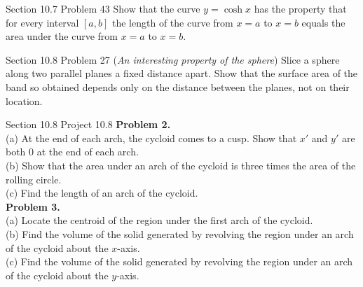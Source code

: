 \documentclass{article}
\begin{document}
    \begin{tbhtheorem}{Section 10.7 Problem 43}
        Show that the curve $y=\cosh{x}$ has the property that for every interval $[a,b]$ the length of the curve from $x=a$ to $x=b$ equals the area under the curve from $x=a$ to $x=b$.
    \end{tbhtheorem}

    \begin{tbhtheorem}{Section 10.8 Problem 27}
        (\textit{An interesting property of the sphere}) Slice a sphere along two parallel planes a fixed distance apart. Show that the surface area of the band so obtained depends only on the distance between the
        planes, not on their location.
    \end{tbhtheorem}

    \begin{tbhtheorem}{Section 10.8 Project 10.8}
        \textbf{Problem 2.} \\
        (a) At the end of each arch, the cycloid comes to a cusp. Show that $x'$ and $y'$ are both 0 at the end of each arch. \\
        (b) Show that the area under an arch of the cycloid is three times the area of the rolling circle. \\
        (c) Find the length of an arch of the cycloid. \\

        \textbf{Problem 3.} \\
        (a) Locate the centroid of the region under the first arch of the cycloid. \\
        (b) Find the volume of the solid generated by revolving the region under an arch of the cycloid about the $x$-axis. \\
        (c) Find the volume of the solid generated by revolving the region under an arch of the cycloid about the $y$-axis.
    \end{tbhtheorem}
\end{document}
